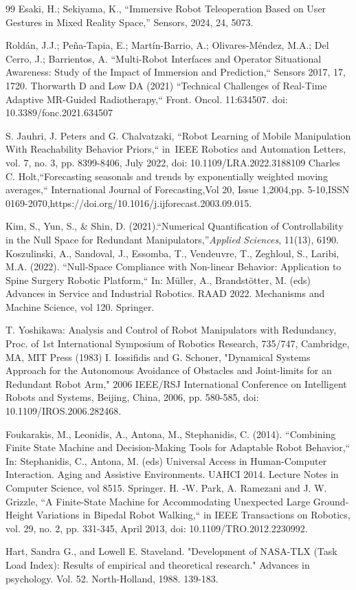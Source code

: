 \begin{thebibliography}{99}
Esaki, H.; Sekiyama, K., ``Immersive Robot Teleoperation Based on User Gestures in Mixed Reality Space,'' Sensors, 2024, 24, 5073.

Roldán, J.J.; Peña-Tapia, E.; Martín-Barrio, A.; Olivares-Méndez, M.A.; Del Cerro, J.; Barrientos, A. ``Multi-Robot Interfaces and Operator Situational Awareness: Study of the Impact of Immersion and Prediction,`` Sensors 2017, 17, 1720.
Thorwarth D and Low DA (2021) ``Technical Challenges of Real-Time Adaptive MR-Guided Radiotherapy,`` Front. Oncol. 11:634507. doi: 10.3389/fonc.2021.634507






S. Jauhri, J. Peters and G. Chalvatzaki, ``Robot Learning of Mobile Manipulation With Reachability Behavior Priors,`` in IEEE Robotics and Automation Letters, vol. 7, no. 3, pp. 8399-8406, July 2022, doi: 10.1109/LRA.2022.3188109
Charles C. Holt,``Forecasting seasonals and trends by exponentially weighted moving averages,``
International Journal of Forecasting,Vol 20, Issue 1,2004,pp. 5-10,ISSN 0169-2070,https://doi.org/10.1016/j.ijforecast.2003.09.015.

Kim, S., Yun, S., \& Shin, D. (2021).``Numerical Quantification of Controllability in the Null Space for Redundant Manipulators,''\textit{Applied Sciences}, 11(13), 6190.
Koszulinski, A., Sandoval, J., Essomba, T., Vendeuvre, T., Zeghloul, S., Laribi, M.A. (2022). ``Null-Space Compliance with Non-linear Behavior: Application to Spine Surgery Robotic Platform,`` In: Müller, A., Brandstötter, M. (eds) Advances in Service and Industrial Robotics. RAAD 2022. Mechanisms and Machine Science, vol 120. Springer.

T. Yoshikawa: Analysis and Control of Robot Manipulators with Redundancy, Proc. of 1st International Symposium of Robotics Research, 735/747, Cambridge, MA, MIT Press (1983)
I. Iossifidis and G. Schoner, "Dynamical Systems Approach for the Autonomous Avoidance of Obstacles and Joint-limits for an Redundant Robot Arm," 2006 IEEE/RSJ International Conference on Intelligent Robots and Systems, Beijing, China, 2006, pp. 580-585, doi: 10.1109/IROS.2006.282468.

Foukarakis, M., Leonidis, A., Antona, M., Stephanidis, C. (2014). ``Combining Finite State Machine and Decision-Making Tools for Adaptable Robot Behavior,`` In: Stephanidis, C., Antona, M. (eds) Universal Access in Human-Computer Interaction. Aging and Assistive Environments. UAHCI 2014. Lecture Notes in Computer Science, vol 8515. Springer.
H. -W. Park, A. Ramezani and J. W. Grizzle, ``A Finite-State Machine for Accommodating Unexpected Large Ground-Height Variations in Bipedal Robot Walking,`` in IEEE Transactions on Robotics, vol. 29, no. 2, pp. 331-345, April 2013, doi: 10.1109/TRO.2012.2230992.

Hart, Sandra G., and Lowell E. Staveland. "Development of NASA-TLX (Task Load Index): Results of empirical and theoretical research." Advances in psychology. Vol. 52. North-Holland, 1988. 139-183.



\end{thebibliography}
